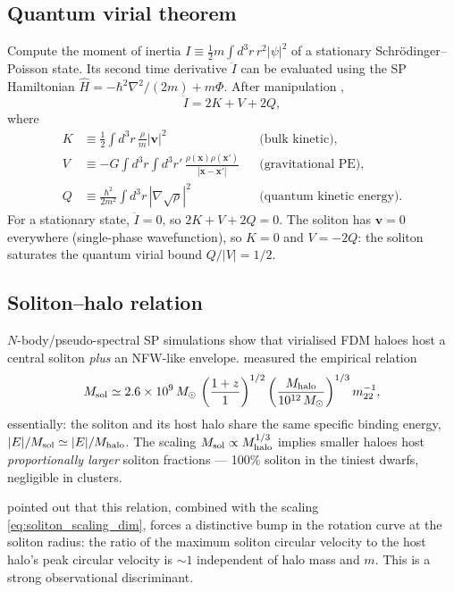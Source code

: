 \documentclass[12pt]{article}
\newcommand{\bx}{\mathbf{x}}
\newcommand{\bv}{\mathbf{v}}
\newcommand{\Msun}{\,M_\odot}
\newcommand{\mtwtwo}{m_{22}}
\begin{document}
\subsection{Quantum virial theorem}

Compute the moment of inertia
$I \equiv \tfrac{1}{2}m\int d^3r\,r^2|\psi|^2$ of a stationary
Schr\"odinger--Poisson state.  Its second time derivative
$\ddot I$ can be evaluated using the SP Hamiltonian
$\hat H = -\hbar^2\nabla^2/(2m)+m\Phi$.  After manipulation
\citep{Hui2017},
%
\begin{equation}
  \ddot I = 2K + V + 2Q,
\end{equation}
%
where
%
\begin{align*}
  K &\equiv \frac{1}{2}\int d^3r\,\frac{\rho}{m}|\bv|^2
    &&\text{(bulk kinetic)}, \\
  V &\equiv -G\!\int d^3r\!\int d^3r'\,
    \frac{\rho(\bx)\rho(\bx')}{|\bx-\bx'|}
    &&\text{(gravitational PE)}, \\
  Q &\equiv \frac{\hbar^2}{2m^2}\!\int d^3r\,|\nabla\sqrt\rho|^2
    &&\text{(quantum kinetic energy)}.
\end{align*}
%
For a stationary state, $\ddot I = 0$, so $2K + V + 2Q = 0$.  The
soliton has $\bv=0$ everywhere (single-phase wavefunction), so $K=0$
and $V=-2Q$: the soliton saturates the quantum virial bound
$Q/|V| = 1/2$.

\subsection{Soliton--halo relation}

$N$-body/pseudo-spectral SP simulations \citep{Schive2014,Schive2014b}
show that virialised FDM haloes host a central soliton \emph{plus} an
NFW-like envelope.  \citet{Schive2014b} measured the empirical
relation
%
\begin{equation}
  M_{\rm sol} \simeq
    2.6\times 10^{9}\Msun\,
    \left(\frac{1+z}{1}\right)^{1/2}
    \left(\frac{M_{\rm halo}}{10^{12}\Msun}\right)^{1/3}
    \mtwtwo^{-1},
  \label{eq:M_soliton_halo}
\end{equation}
%
essentially: the soliton and its host halo share the same
specific binding energy, $|E|/M_{\rm sol} \simeq |E|/M_{\rm halo}$.
The scaling $M_{\rm sol}\propto M_{\rm halo}^{1/3}$ implies smaller
haloes host \emph{proportionally larger} soliton fractions --- 100\%
soliton in the tiniest dwarfs, negligible in clusters.

\citet{Bar2018} pointed out that this relation, combined with the
scaling \eqref{eq:soliton_scaling_dim}, forces a distinctive bump in
the rotation curve at the soliton radius: the ratio of the maximum
soliton circular velocity to the host halo's peak circular velocity is
$\sim 1$ independent of halo mass and $m$.  This is a strong
observational discriminant.
\end{document}
